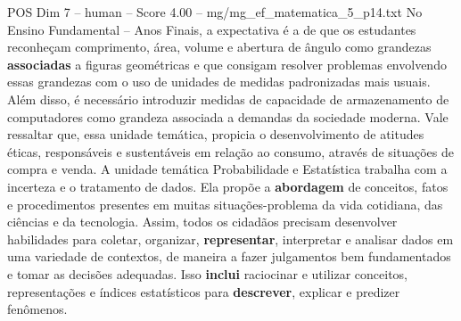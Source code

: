 \begin{textsample}{POS Dim 7 – human – Score 4.00 – mg/mg\_ef\_matematica\_5\_p14.txt}  \label{ex:f7_pos_010}
No Ensino Fundamental – Anos Finais, a expectativa é a de que os estudantes reconheçam comprimento, área, volume e abertura de ângulo como grandezas \textbf{associadas} a figuras geométricas e que consigam resolver problemas envolvendo essas grandezas com o uso de unidades de medidas padronizadas mais usuais.
Além disso, é necessário introduzir medidas de capacidade de armazenamento de computadores como grandeza associada a demandas da sociedade moderna.
Vale ressaltar que, essa unidade temática, propicia o desenvolvimento de atitudes éticas, responsáveis e sustentáveis em relação ao consumo, através de situações de compra e venda.
A unidade temática Probabilidade e Estatística trabalha com a incerteza e o tratamento de dados.
Ela propõe a \textbf{abordagem} de conceitos, fatos e procedimentos presentes em muitas situações-problema da vida cotidiana, das ciências e da tecnologia.
Assim, todos os cidadãos precisam desenvolver habilidades para coletar, organizar, \textbf{representar}, interpretar e analisar dados em uma variedade de contextos, de maneira a fazer julgamentos bem fundamentados e tomar as decisões adequadas.
Isso \textbf{inclui} raciocinar e utilizar conceitos, representações e índices estatísticos para \textbf{descrever}, explicar e predizer fenômenos.

\end{textsample}
